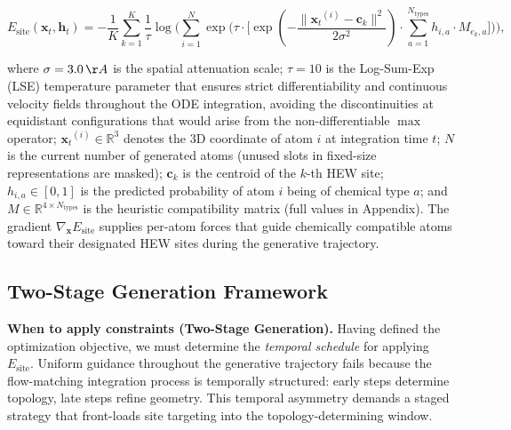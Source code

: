 \documentclass{article}
\newcommand{\reals}{\ensuremath{\mathbb{R}}}
\newcommand{\xt}{\ensuremath{\bm{x}_t}}
\newcommand{\htensor}{\ensuremath{\bm{h}_t}}
\begin{document}
\begin{equation}\label{eq:site_energy_full}
E_{\text{site}}(\xt, \htensor) =
  -\frac{1}{K} \sum_{k=1}^{K} \frac{1}{\tau} \log \Bigg(
    \sum_{i=1}^{N} \exp\Bigg(
      \tau \cdot \Bigg[
        \exp\!\left(-\frac{\|\xt^{(i)} - \mathbf{c}_k\|^2}{2\sigma^2}\right)
        \cdot \sum_{a=1}^{N_{\text{types}}} h_{i,a} \cdot M_{e_k, a}
      \Bigg]
    \Bigg)
  \Bigg),
\end{equation}

where $\sigma = 3.0\,\AA$ is the spatial attenuation scale; $\tau = 10$ is
the Log-Sum-Exp (LSE) temperature parameter that ensures strict
differentiability and continuous velocity fields throughout the ODE
integration, avoiding the discontinuities at equidistant configurations
that would arise from the non-differentiable $\max$ operator;
$\xt^{(i)} \in \reals^3$ denotes the 3D coordinate of atom $i$ at
integration time $t$; $N$ is the current number of generated atoms
(unused slots in fixed-size representations are masked);
$\mathbf{c}_k$ is the centroid of the $k$-th HEW site;
$h_{i,a} \in [0,1]$ is the predicted probability of atom $i$ being of
chemical type $a$; and
$M \in \mathbb{R}^{4 \times N_{\text{types}}}$ is the heuristic
compatibility matrix (full values in Appendix).
The gradient $\nabla_{\bm{x}} E_{\text{site}}$
supplies per-atom forces that guide chemically compatible atoms toward their
designated HEW sites during the generative trajectory.

\subsection{Two-Stage Generation Framework}
\label{sec:two_stage}

\textbf{When to apply constraints (Two-Stage Generation).}
Having defined the optimization objective, we must determine the
\emph{temporal schedule} for applying $E_{\text{site}}$.  Uniform guidance
throughout the generative trajectory fails because the flow-matching
integration process is temporally structured: early steps determine
topology, late steps refine geometry.  This temporal asymmetry demands
a staged strategy that front-loads site targeting into the
topology-determining window.
\end{document}
